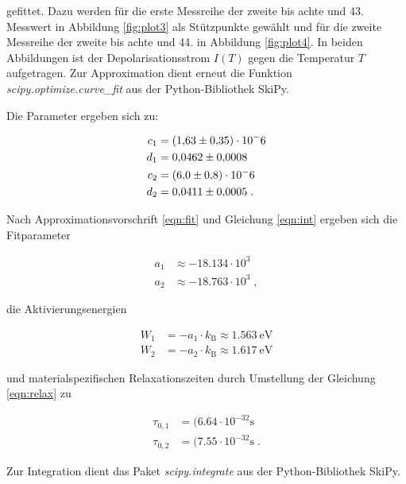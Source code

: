 gefittet. Dazu werden für die erste Messreihe der zweite bis achte und 43. Messwert in Abbildung \ref{fig:plot3} als Stützpunkte gewählt 
und für die zweite Messreihe der zweite bis achte und 44. in Abbildung \ref{fig:plot4}.
In beiden Abbildungen ist der Depolarisationsstrom $I(T)$ gegen die Temperatur $T$ aufgetragen.
Zur Approximation dient erneut die Funktion \textit{scipy.optimize.curve\_fit} aus der Python-Bibliothek SkiPy.

Die Parameter ergeben sich zu:

\begin{align*}
  c_1 &= (\num{1.63 +- 0.35})\cdot 10^-6 \\
  d_1 &= \num{0.0462 +- 0.0008} \\
  c_2 &= (\num{6.0 +- 0.8})\cdot 10^-6 \\
  d_2 &= \num{0.0411 +- 0.0005} \; .
\end{align*}

Nach Approximationsvorschrift \eqref{eqn:fit} und Gleichung \eqref{eqn:int} ergeben sich die
Fitparameter 

\begin{align*}
  a_1 &\approx \num{-18.134} \cdot 10^3 \\
  a_2 &\approx \num{-18.763} \cdot 10^3  \; ,
\end{align*}

die Aktivierungsenergien

\begin{align*}
  W_1 &= -a_1 \cdot k_\text{B} \approx \SI{1.563}{\eV} \\
  W_2 &= -a_2 \cdot k_\text{B} \approx \SI{1.617}{\eV}
\end{align*}

und materialspezifischen Relaxationszeiten durch Umstellung der Gleichung \eqref{eqn:relax} zu

\begin{align*}
  \tau_{0,1} &= (\num{6.64} \cdot 10^{-32} \si{\second}\\
  \tau_{0,2} &= (\num{7.55} \cdot 10^{-32} \si{\second} \; .
\end{align*}

Zur Integration dient das Paket \textit{scipy.integrate} aus der Python-Bibliothek SkiPy.







